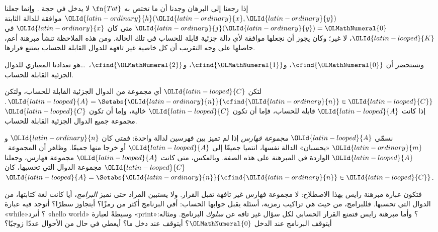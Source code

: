 \documentclass[../../../include/open-logic-section]{subfiles}
\begin{document}

إذا رجعنا إلى البرهان وجدنا أن ما تختص به $\fn{Tot}$ لا يدخل
في حجة . وإنما جعلنا $\OLId{latin-ordinary}{h}(\OLId{latin-ordinary}{x},\OLId{latin-ordinary}{y})$ موافقة
للدالة الثابتة $\OLId{latin-ordinary}{j}(\OLId{latin-ordinary}{y})=\OLMathNumeral{0}$ متى كان $\OLId{latin-ordinary}{x}$ في $\OLId{latin-looped}{K}$، لا غير؛ وكان
يجوز أن نجعلها موافقة لأي دالة جزئية قابلة
للحساب في تلك الحالة. ومن هذه الملاحظة تنشأ مبرهنة أعم، حاصلها على وجه
التقريب أن كل خاصية غير تافهة للدوال القابلة للحساب
يمتنع قرارها.

ونستحضر أن $\cfind{\OLMathNumeral{0}}$، و$\cfind{\OLMathNumeral{1}}$، و$\cfind{\OLMathNumeral{2}}$،~\dots هو تعدادنا
المعياري للدوال الجزئية القابلة للحساب.

\begin{thm}
  لتكن $\OLId{latin-looped}{C}$ أي مجموعة من الدوال الجزئية القابلة للحساب، ولتكن $\OLId{latin-looped}{A} =
  \Setabs{\OLId{latin-ordinary}{n}}{\cfind{\OLId{latin-ordinary}{n}} \in \OLId{latin-looped}{C}}$. إذا كانت $\OLId{latin-looped}{A}$ قابلة للحساب، فإما أن
  تكون $\OLId{latin-looped}{C}$ خالية، وإما أن تكون $\OLId{latin-looped}{C}$ مجموعة جميع الدوال الجزئية
  القابلة للحساب.
\end{thm}

نسمّي $\OLId{latin-looped}{A}$ \emph{مجموعة فهارس} إذا لم تميز بين فهرسين لدالة واحدة:
فمتى كان $\OLId{latin-ordinary}{n}$ و$\OLId{latin-ordinary}{m}$ «يحسبان» الدالة نفسها، انتميا جميعًا
إلى $\OLId{latin-looped}{A}$ أو خرجا منها جميعًا. وظاهر أن
المجموعة~$\OLId{latin-looped}{A}$ الواردة في المبرهنة على هذه الصفة. وبالعكس، متى كانت $\OLId{latin-looped}{A}$
مجموعة فهارس، وجعلنا $\OLId{latin-looped}{C}$ مجموعة الدوال التي تحسبها، كان
$\OLId{latin-looped}{A} = \Setabs{\OLId{latin-ordinary}{n}}{\cfind{\OLId{latin-ordinary}{n}} \in \OLId{latin-looped}{C}}$.

\begin{explain}
فتكون عبارة مبرهنة رايس بهذا الاصطلاح: لا مجموعة فهارس غير تافهة
تقبل القرار. ولا يستبين المراد حتى نميز
\emph{البرامج}، أيا كانت لغة كتابتها، من الدوال
التي تحسبها. فللبرامج، من حيث هي تراكيب رمزية،
أسئلة يقبل جوابها الحساب: أفي البرنامج أكثر من  رمزًا؟ أيتجاوز 
سطرًا؟ أتوجد فيه عبارة «while»؟ أترد «hello world» وسيطةً
لعبارة «print»؟ وأما مبرهنة رايس فتمنع القرار الحسابي لكل سؤال غير تافه عن
\emph{سلوك} البرنامج. ومثاله: أيتوقف
البرنامج عند الدخل $\OLMathNumeral{0}$؟ أيتوقف عند دخل ما؟ أيعطي في حال من الأحوال عددًا زوجيًا؟
\end{explain}
\end{document}
